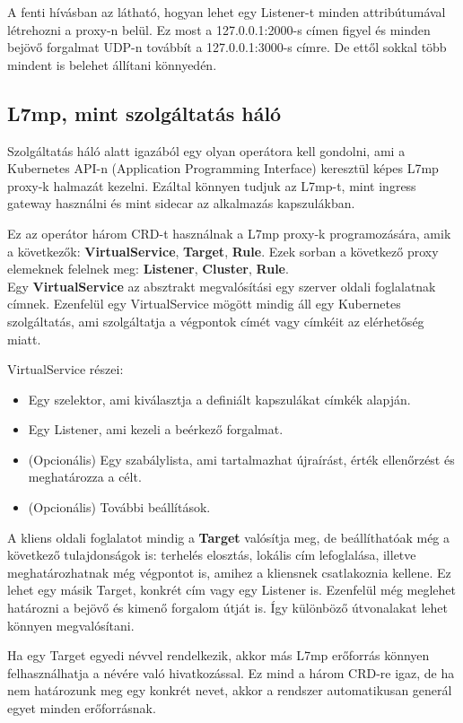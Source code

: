 A fenti hívásban az látható, hogyan lehet egy Listener-t minden attribútumával 
létrehozni a proxy-n belül. Ez most a 127.0.0.1:2000-s címen figyel és minden 
bejövő forgalmat UDP-n továbbít a 127.0.0.1:3000-s címre. De ettől sokkal több
mindent is belehet állítani könnyedén. 

\subsection{L7mp, mint szolgáltatás háló}

Szolgáltatás háló alatt igazából egy olyan operátora kell gondolni, ami a Kubernetes
API-n (Application Programming Interface) keresztül képes L7mp proxy-k halmazát 
kezelni. Ezáltal könnyen tudjuk az L7mp-t, mint ingress gateway használni és 
mint sidecar az alkalmazás kapszulákban.

Ez az operátor három CRD-t használnak a L7mp proxy-k programozására, amik a következők:
\textbf{VirtualService}, \textbf{Target}, \textbf{Rule}. Ezek sorban a következő proxy 
elemeknek felelnek meg: \textbf{Listener}, \textbf{Cluster}, \textbf{Rule}. \\ 

Egy \textbf{VirtualService} az absztrakt megvalósítási egy szerver oldali foglalatnak címnek. 
Ezenfelül egy VirtualService mögött mindig áll egy Kubernetes szolgáltatás, ami 
szolgáltatja a végpontok címét vagy címkéit az elérhetőség miatt.

VirtualService részei: 

\begin{itemize}
	\item Egy szelektor, ami kiválasztja a definiált kapszulákat címkék alapján.
	\item Egy Listener, ami kezeli a beérkező forgalmat. 
	\item (Opcionális) Egy szabálylista, ami tartalmazhat újraírást, érték ellenőrzést
	és meghatározza a célt. 
	\item (Opcionális) További beállítások.  
\end{itemize}

A kliens oldali foglalatot mindig a \textbf{Target} valósítja meg, de beállíthatóak még a 
következő tulajdonságok is: terhelés elosztás, lokális cím lefoglalása, illetve 
meghatározhatnak még végpontot is, amihez a kliensnek csatlakoznia kellene. Ez 
lehet egy másik Target, konkrét cím vagy egy Listener is. Ezenfelül még meglehet 
határozni a bejövő és kimenő forgalom útját is. Így különböző útvonalakat lehet 
könnyen megvalósítani. 

Ha egy Target egyedi névvel rendelkezik, akkor más L7mp erőforrás könnyen 
felhasználhatja a névére való hivatkozással. Ez mind a három CRD-re igaz, de ha
nem határozunk meg egy konkrét nevet, akkor a rendszer automatikusan generál 
egyet minden erőforrásnak. 

